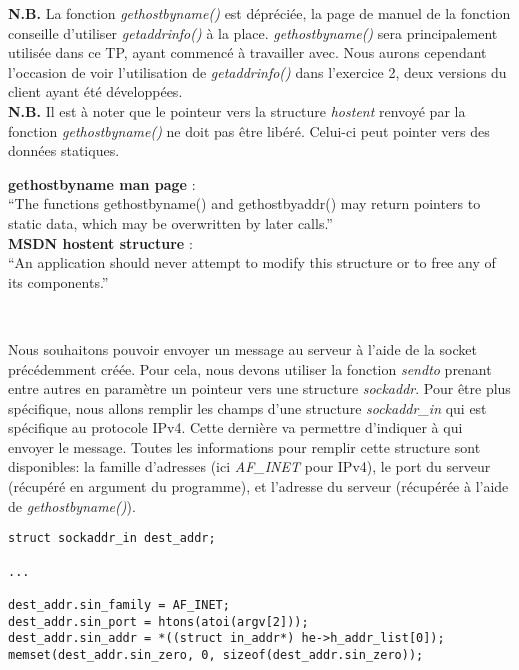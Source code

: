 \documentclass[a4paper, frenchb, 11pt]{article}
\begin{document}
\noindent \textbf{N.B.} La fonction \emph{gethostbyname()} est dépréciée, la page de manuel de la fonction conseille d'utiliser \emph{getaddrinfo()} à la place. \emph{gethostbyname()} sera principalement utilisée dans ce TP, ayant commencé à travailler avec. Nous aurons cependant l'occasion de voir l'utilisation de \emph{getaddrinfo()} dans l'exercice 2, deux versions du client ayant été développées.\\

\noindent \textbf{N.B.} Il est à noter que le pointeur vers la structure \emph{hostent} renvoyé par la fonction \emph{gethostbyname()} ne doit pas être libéré. Celui-ci peut pointer vers des données statiques.

\begin{mdframed}[backgroundcolor=lightblue, linecolor=darkblue]
	\textbf{gethostbyname man page} :\\ %
	``The functions gethostbyname() and gethostbyaddr() may  return  pointers to  static  data, which may be overwritten by later calls.''\\

	\noindent\textbf{MSDN hostent structure} :\\ %
	``An application should never attempt to modify this structure or to free any of its components.''
\end{mdframed}
\

Nous souhaitons pouvoir envoyer un message au serveur à l'aide de la socket précédemment créée. Pour cela, nous devons utiliser la fonction \emph{sendto} prenant entre autres en paramètre un pointeur vers une structure \emph{sockaddr}. Pour être plus spécifique, nous allons remplir les champs d'une structure \emph{sockaddr\_in} qui est spécifique au protocole IPv4. Cette dernière va permettre d'indiquer à qui envoyer le message. Toutes les informations pour remplir cette structure sont disponibles: la famille d'adresses (ici \emph{AF\_INET} pour IPv4), le port du serveur (récupéré en argument du programme), et l'adresse du serveur (récupérée à l'aide de \emph{gethostbyname()}).

\begin{lstlisting}
struct sockaddr_in dest_addr;

...

dest_addr.sin_family = AF_INET;
dest_addr.sin_port = htons(atoi(argv[2]));
dest_addr.sin_addr = *((struct in_addr*) he->h_addr_list[0]);
memset(dest_addr.sin_zero, 0, sizeof(dest_addr.sin_zero));
\end{lstlisting}
\
\end{document}
